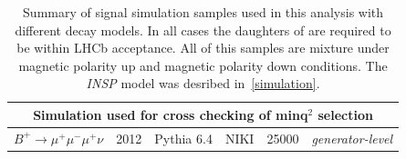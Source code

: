 \begin{table}[h!]
\begin{center}
\begin{tabular}{l l l l l l}
                         \multicolumn{6}{c}{Simulation used for cross checking of minq$^{2}$ selection} \\ \hline 

			$B^{+} \rightarrow \mu^{+} \mu^{-} \mu^{+} \nu$ & 2012 & Pythia 6.4\cite{pythia6} & NIKI & 25000 & \textit{generator-level}\\ %
%
			\hline
		\end{tabular}
	\end{center}
	\caption{Summary of signal simulation samples used in this analysis with different decay models. In all cases the daughters of \Bpm are required to be within \gls{LHCb} acceptance. All of this samples are mixture under magnetic polarity up and magnetic polarity down conditions. The \textit{INSP} model was desribed in~\autoref{simulation}.}
	\label{tab:MCPPass}
\end{table}


